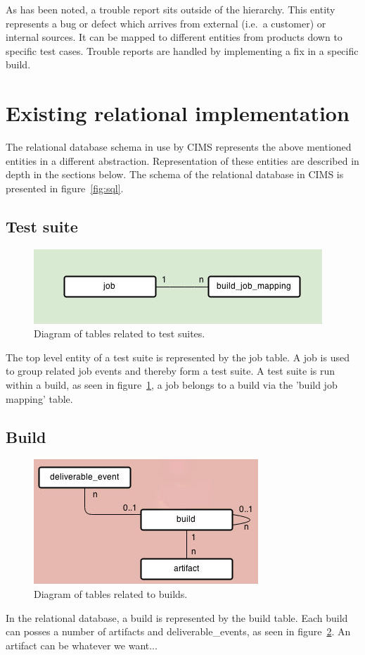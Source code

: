 As has been noted, a trouble report sits outside of the hierarchy. This entity represents a bug or defect which arrives from external (i.e.\ a customer) or internal sources. It can be mapped to different entities from products down to specific test cases. Trouble reports are handled by implementing a fix in a specific build.


\section{Existing relational implementation}
The relational database schema in use by CIMS represents the above mentioned entities in a different abstraction. Representation of these entities are described in depth in the sections below. 
The schema of the relational database in CIMS is presented in figure~\ref{fig:sql}.
\subsection{Test suite}
\begin{figure}[h!]
\centering
\includegraphics[scale=0.5]{figure/job.jpg}
\caption{Diagram of tables related to test suites.}
\label{fig:job}
\end{figure}
The top level entity of a test suite is represented by the job table. A job is used to group related job events and thereby form a test suite. A test suite is run within a build, as seen in figure~\ref{fig:job}, a job belongs to a build via the 'build job mapping' table.
\subsection{Build}
\begin{figure}[h!]
\centering
\includegraphics[scale=0.5]{figure/build.jpg}
\caption{Diagram of tables related to builds.}
\label{fig:build}
\end{figure}
In the relational database, a build is represented by the build table. Each build can posses a number of artifacts and deliverable\_events, as seen in figure~\ref{fig:build}. An artifact can be whatever we want...
